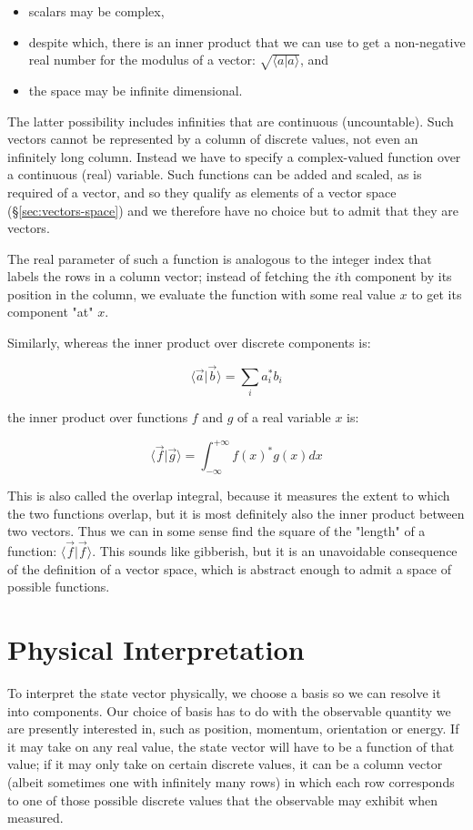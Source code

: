 \begin{itemize}
  \item scalars may be complex,
  \item despite which, there is an inner product that we can use to get a non-negative real number for the modulus of a vector: $\sqrt{\langle a|a \rangle}$, and 
  \item the space may be infinite dimensional.
\end{itemize}

The latter possibility includes infinities that are continuous (uncountable). Such vectors cannot be represented by a column of discrete values, not even an infinitely long column. Instead we have to specify a complex-valued function over a continuous (real) variable. Such functions can be added and scaled, as is required of a vector, and so they qualify as elements of a vector space (§\ref{sec:vectors-space}) and we therefore have no choice but to admit that they are vectors.

The real parameter of such a function is analogous to the integer index that labels the rows in a column vector; instead of fetching the $i$th component by its position in the column, we evaluate the function with some real value $x$ to get its component "at" $x$.

Similarly, whereas the inner product over discrete components is:

$$
\langle \vec{a} | \vec{b} \rangle
=
\sum_i
a_i^* b_i
$$

the inner product over functions $f$ and $g$ of a real variable $x$ is:

$$
\langle \vec{f} | \vec{g} \rangle
=
\int_{-\infty}^{+\infty}
f(x)^* g(x)
dx
$$

This is also called the overlap integral, because it measures the extent to which the two functions overlap, but it is most definitely also the inner product between two vectors. Thus we can in some sense find the square of the "length" of a function: $\langle \vec{f} | \vec{f} \rangle$. This sounds like gibberish, but it is an unavoidable consequence of the definition of a vector space, which is abstract enough to admit a space of possible functions.

\section{Physical Interpretation}

To interpret the state vector physically, we choose a basis so we can resolve it into components. Our choice of basis has to do with the observable quantity we are presently interested in, such as position, momentum, orientation or energy. If it may take on any real value, the state vector will have to be a function of that value; if it may only take on certain discrete values, it can be a column vector (albeit sometimes one with infinitely many rows) in which each row corresponds to one of those possible discrete values that the observable may exhibit when measured.

